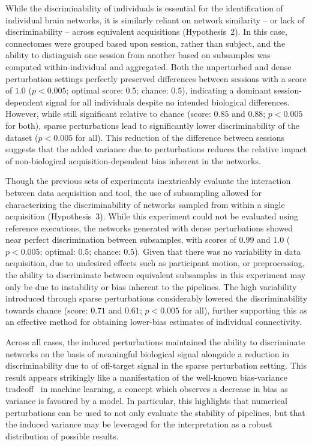 \documentclass[fleqn,10pt]{SelfArx} %
\begin{document}
While the discriminability of individuals is essential for the identification of individual brain networks, it is
similarly reliant on network similarity – or lack of discriminability – across equivalent acquisitions (Hypothesis~2).
In this case, connectomes were grouped based upon session, rather than subject, and the ability to distinguish one
session from another based on subsamples was computed within-individual and aggregated. Both the unperturbed and dense
perturbation settings perfectly preserved differences between sessions with a score of $1.0$ ($p < 0.005$; optimal
score: $0.5$; chance: $0.5$), indicating a dominant session-dependent signal for all individuals despite no intended
biological differences. However, while still significant relative to chance (score: $0.85$ and $0.88$; $p < 0.005$ for
both), sparse perturbations lead to significantly lower discriminability of the dataset ($p < 0.005$ for all).
This reduction of the difference between sessions suggests that the added variance due to perturbations
reduces the relative impact of non-biological acquisition-dependent bias inherent in the networks.

Though the previous sets of experiments inextricably evaluate the interaction between data acquisition and tool,
the use of subsampling allowed for characterizing the discriminability of networks sampled from within a single
acquisition (Hypothesis~3). While this experiment could not be evaluated using reference executions, the networks
generated with dense perturbations showed near perfect discrimination between subsamples, with scores of $0.99$ and
$1.0$ ($p < 0.005$; optimal: $0.5$; chance: $0.5$). Given that there was no variability in data acquisition, due to
undesired effects such as participant motion, or preprocessing, the ability to discriminate between equivalent
subsamples in this experiment may only be due to instability or bias inherent to the pipelines. The high variability
introduced through sparse perturbations considerably lowered the discriminability towards chance (score:
$0.71$ and $0.61$; $p < 0.005$ for all), further supporting this as an effective method for obtaining lower-bias
estimates of individual connectivity.

Across all cases, the induced perturbations maintained the ability to discriminate networks on the basis of
meaningful biological signal alongside a reduction in discriminability due to of off-target signal in the sparse
perturbation setting. This result appears strikingly like a manifestation of the well-known bias-variance
tradeoff~\cite{geman1992neural} in machine learning, a concept which observes a decrease in bias as variance is
favoured by a model. In particular, this highlights that numerical perturbations can be used to not only evaluate the
stability of pipelines, but that the induced variance may be leveraged for the interpretation as a robust distribution
of possible results.
\end{document}
